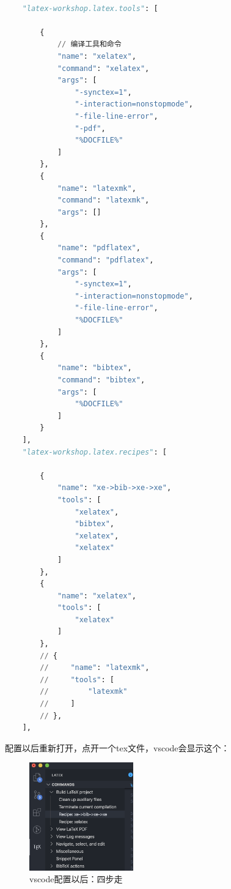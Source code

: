 \documentclass[AutoFakeBold]{LZUThesis2007}
\begin{document}
\begin{lstlisting}[language = python]
    
    "latex-workshop.latex.tools": [
    
        {
            // 编译工具和命令
            "name": "xelatex",
            "command": "xelatex",
            "args": [
                "-synctex=1",
                "-interaction=nonstopmode",
                "-file-line-error",
                "-pdf",
                "%DOCFILE%"
            ]
        },
        {
            "name": "latexmk",
            "command": "latexmk",
            "args": []
        },
        {
            "name": "pdflatex",
            "command": "pdflatex",
            "args": [
                "-synctex=1",
                "-interaction=nonstopmode",
                "-file-line-error",
                "%DOCFILE%"
            ]
        },
        {
            "name": "bibtex",
            "command": "bibtex",
            "args": [
                "%DOCFILE%"
            ]
        }
    ],
    "latex-workshop.latex.recipes": [

        {
            "name": "xe->bib->xe->xe",
            "tools": [
                "xelatex",
                "bibtex",
                "xelatex",
                "xelatex"
            ]
        },
        {
            "name": "xelatex",
            "tools": [
                "xelatex"
            ]
        },
        // {
        //     "name": "latexmk",
        //     "tools": [
        //         "latexmk"
        //     ]
        // },
    ],
\end{lstlisting}

配置以后重新打开，点开一个tex文件，vscode会显示这个：

\begin{figure}[H]
    \centering
    \includegraphics[width=0.4\textwidth]{figures/vscode_4.png}
    \caption{vscode配置以后：四步走}
    \label{fig_install_texlive}
\end{figure}
\end{document}
